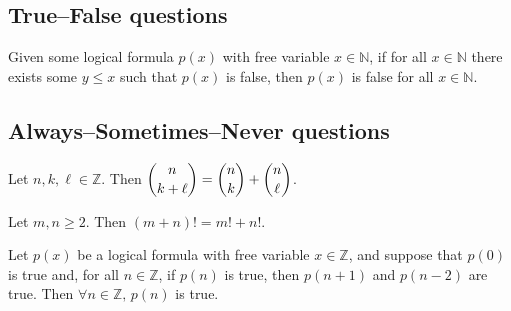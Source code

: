 \subsection*{True--False questions}


\begin{chapex}
\label{cqInductionTFBegin}

\end{chapex}

\begin{chapex} %
Given some logical formula $p(x)$ with free variable $x \in \mathbb{N}$, if for all $x \in \mathbb{N}$ there exists some $y \le x$ such that $p(x)$ is false, then $p(x)$ is false for all $x \in \mathbb{N}$.
\end{chapex}

\begin{chapex}
\label{cqInductionTFEnd}
\end{chapex}

\subsection*{Always--Sometimes--Never questions}


\begin{chapex}
\label{cqInductionASNBegin}

\end{chapex}

\begin{chapex} %
Let $n,k,\ell \in \mathbb{Z}$. Then $\dbinom{n}{k+\ell} = \dbinom{n}{k} + \dbinom{n}{\ell}$.
\end{chapex}

\begin{chapex} %
Let $m,n \ge 2$. Then $(m+n)! = m!+n!$.
\end{chapex}

\begin{chapex} %
Let $p(x)$ be a logical formula with free variable $x \in \mathbb{Z}$, and suppose that $p(0)$ is true and, for all $n \in \mathbb{Z}$, if $p(n)$ is true, then $p(n+1)$ and $p(n-2)$ are true. Then $\forall n \in \mathbb{Z},\, p(n)$ is true.
\end{chapex}

\begin{chapex}
\label{cqInductionASNEnd}
\end{chapex}